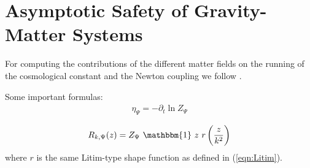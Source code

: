 \chapter{Asymptotic Safety of Gravity-Matter Systems}
For computing the contributions of the different matter fields on the running of the cosmological constant and the Newton coupling we follow \cite{DonaEichhornPercacci2013}. 


Some important formulas:
\begin{align}
	\eta_{\Psi} = -\partial_t \ln Z_{\Psi}
\end{align}

\begin{align}
	R_{k, \Psi}(z) = Z_{\Psi} \ \mathbbm{1} \ z \ r\left(\frac{z}{k^2}\right)
\end{align}
where $r$ is the same Litim-type shape function as defined in (\ref{eqn:Litim}).
